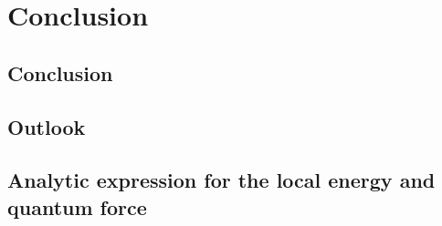 \documentclass[a4paper, 10pt]{article}
\begin{document}
	
	
	\section{Conclusion}
	
	\subsection{Conclusion}
	
	\subsection{Outlook}
	
	\begin{appendices}
		\section{Analytic expression for the local energy and quantum force}

\end{appendices}
\end{document}
